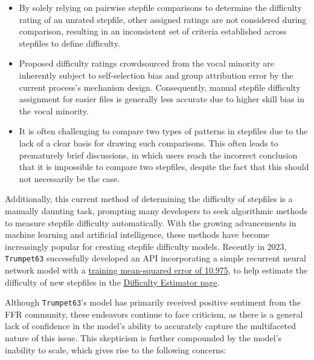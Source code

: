 \begin{itemize}
	\item By solely relying on pairwise stepfile comparisons to determine the difficulty rating of an unrated stepfile, other assigned ratings are not considered during comparison, resulting in an inconsistent set of criteria established across stepfiles to define difficulty.
	\item Proposed difficulty ratings crowdsourced from the vocal minority are inherently subject to self-selection bias and group attribution error by the current process's mechanism design. Consequently, manual stepfile difficulty assignment for easier files is generally less accurate due to higher skill bias in the vocal minority.
    \item It is often challenging to compare two types of patterns in stepfiles due to the lack of a clear basis for drawing such comparisons. This often leads to prematurely brief discussions, in which users reach the incorrect conclusion that it is impossible to compare two stepfiles, despite the fact that this should not necessarily be the case.
\end{itemize}

Additionally, this current method of determining the difficulty of stepfiles is a manually daunting task, prompting many developers to seek algorithmic methods to measure stepfile difficulty automatically. With the growing advancements in machine learning and artificial intelligence, these methods have become increasingly popular for creating stepfile difficulty models. Recently in 2023, \texttt{Trumpet63} successfully developed an API incorporating a simple recurrent neural network model with a \href{https://www.flashflashrevolution.com/vbz/showthread.php?t=154255}{training mean-squared error of 10.975}, to help estimate the difficulty of new stepfiles in the \href{https://www.flashflashrevolution.com/~velocity/ffrjs/difficulty/}{Difficulty Estimator page}.

\vspace{2mm}

Although \texttt{Trumpet63}’s model has primarily received positive sentiment from the FFR community, these endeavors continue to face criticism, as there is a general lack of confidence in the model’s ability to accurately capture the multifaceted nature of this issue. This skepticism is further compounded by the model's inability to scale, which gives rise to the following concerns:

